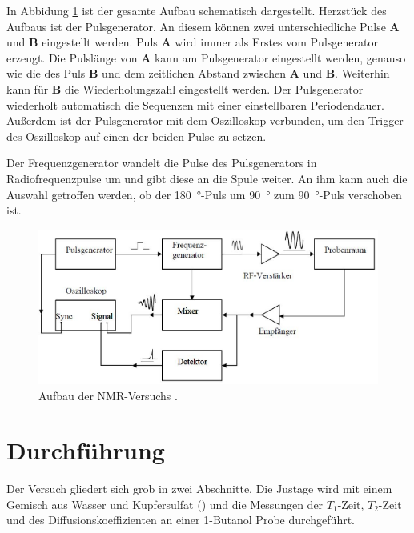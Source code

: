 In Abbidung \ref{fig:Aufbau} ist der gesamte Aufbau schematisch dargestellt.
Herzstück des Aufbaus ist der Pulsgenerator.
An diesem können zwei unterschiedliche Pulse \textbf{A} und \textbf{B} eingestellt werden.
Puls \textbf{A} wird immer als Erstes vom Pulsgenerator erzeugt.
Die Pulslänge von \textbf{A} kann am Pulsgenerator eingestellt werden, genauso wie die des Puls \textbf{B} und dem zeitlichen Abstand zwischen \textbf{A} und \textbf{B}.
Weiterhin kann für \textbf{B} die Wiederholungszahl eingestellt werden.
Der Pulsgenerator wiederholt automatisch die Sequenzen mit einer einstellbaren Periodendauer.
Außerdem ist der Pulsgenerator mit dem Oszilloskop verbunden, um den Trigger des Oszilloskop auf einen der beiden Pulse zu setzen.

Der Frequenzgenerator wandelt die Pulse des Pulsgenerators in Radiofrequenzpulse um und gibt diese an die Spule weiter.
An ihm kann auch die Auswahl getroffen werden, ob der \SI{180}{\degree}-Puls um \SI{90}{\degree} zum \SI{90}{\degree}-Puls verschoben ist.

\begin{figure}[H]
  \centering
  \includegraphics[width = .7\textwidth]{Aufbau.png}
  \caption{Aufbau der NMR-Versuchs \cite{Aachen}.}
  \label{fig:Aufbau}
\end{figure}




\section{Durchführung}
Der Versuch gliedert sich grob in zwei Abschnitte. Die Justage wird mit einem Gemisch aus Wasser und Kupfersulfat () und die Messungen der $T_1$-Zeit, $T_2$-Zeit und des Diffusionskoeffizienten an einer 1-Butanol Probe durchgeführt.



